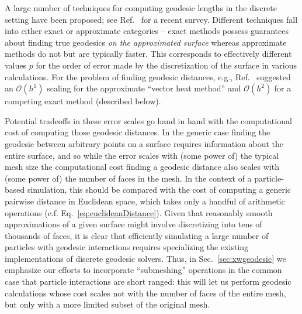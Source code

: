 \documentclass[preprint,12pt]{elsarticle}
\begin{document}
A large number of techniques for computing geodesic lengths in the discrete setting have been proposed; see Ref.~\cite{crane2020survey} for a recent survey. Different techniques fall into either exact or approximate categories -- exact methods possess guarantees about finding true geodesics \emph{on the approximated surface} whereas approximate methods do not  but are typically  faster. This corresponds to effectively different values $p$ for the order of error made by the discretization of the surface in various calculations. For the problem of finding geodesic distances, e.g., Ref.~\cite{sharp2019vector}  suggested an $\mathcal{O}(h^1)$ scaling for the approximate ``vector heat method'' and $\mathcal{O}(h^2)$ for a competing exact method (described below).

Potential tradeoffs in these error scales go hand in hand with the computational cost of computing those geodesic distances. In the generic case finding the geodesic between arbitrary points on a surface requires information about the entire surface, and so while the error scales with (some power of) the typical mesh size the computational cost finding a geodesic distance also scales with (some power of) the number of faces in the mesh.
In the context of a particle-based simulation, this should be compared with the cost of computing a generic pairwise distance in Euclidean space, which takes only a handful of arithmetic operations (c.f. Eq.~\ref{eq:euclideanDistance}).
Given that reasonably smooth approximations of a given surface might involve discretizing into tens of thousands of faces, it is clear that efficiently simulating a large number of particles with geodesic interactions requires specializing the existing implementations of discrete geodesic solvers.
Thus, in Sec.~\ref{sec:xwgeodesic} we emphasize our efforts to incorporate ``submeshing'' operations in the common case that particle interactions are short ranged: this will let us perform geodesic calculations whose cost scales not with the number of faces of the entire mesh, but only with a more limited subset of the original mesh.
\end{document}
